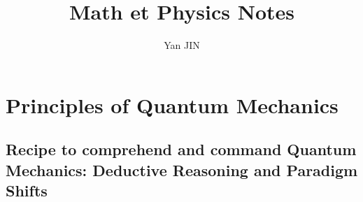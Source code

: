\documentclass[12pt]{article}
\numberwithin{equation}{section}
\begin{document}
\small
    \title{Math et Physics Notes}
    \author{Yan JIN}
    \pagestyle{fancy}\fancyhf{}
    \lhead{}
    \lfoot{\textit{}}\cfoot{}\rfoot{\thepage}
    \renewcommand{\headrulewidth}{1.pt}
    \renewcommand{\footrulewidth}{1.pt}
  \maketitle
  \tableofcontents
\section{Principles of Quantum Mechanics}
\subsection{Recipe to comprehend and command Quantum Mechanics: Deductive Reasoning and  Paradigm Shifts}
\end{document}
